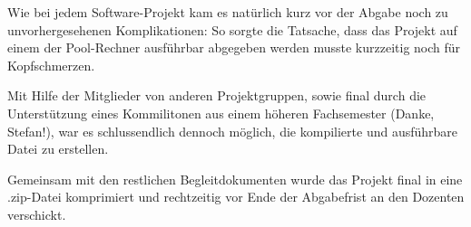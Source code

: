 \documentclass{article}
\begin{document}
Wie bei jedem Software-Projekt kam es natürlich kurz vor der Abgabe noch zu unvorhergesehenen Komplikationen: 
So sorgte die Tatsache, dass das Projekt auf einem der Pool-Rechner ausführbar abgegeben werden musste kurzzeitig noch für Kopfschmerzen. 

Mit Hilfe der Mitglieder von anderen Projektgruppen, sowie final durch die Unterstützung eines Kommilitonen aus einem höheren Fachsemester (Danke, Stefan!), war es schlussendlich dennoch möglich, die kompilierte und ausführbare Datei zu erstellen. 

Gemeinsam mit den restlichen Begleitdokumenten wurde das Projekt final in eine .zip-Datei komprimiert und rechtzeitig vor Ende der Abgabefrist an den Dozenten verschickt. 
\end{document}

